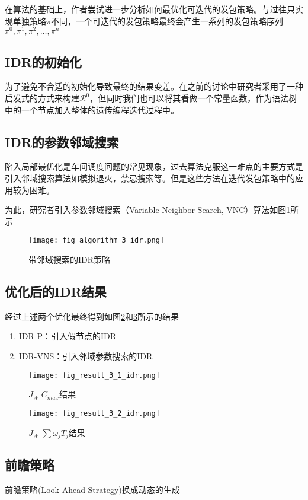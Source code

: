 在算法的基础上，作者尝试进一步分析如何最优化可迭代的发包策略。与过往只实现单独策略$\pi$不同，一个可迭代的发包策略最终会产生一系列的发包策略序列 $\pi^0,\pi^1,\pi^2,\dots,\pi^n$

\subsection{IDR的初始化}

为了避免不合适的初始化导致最终的结果变差。在之前的讨论中研究者采用了一种启发式的方式来构建$\mathcal{R}^0$，但同时我们也可以将其看做一个常量函数，作为语法树中的一个节点加入整体的遗传编程迭代过程中。

\subsection{IDR的参数邻域搜索}

陷入局部最优化是车间调度问题的常见现象，过去算法克服这一难点的主要方式是引入邻域搜索算法如模拟退火，禁忌搜索等。但是这些方法在迭代发包策略中的应用较为困难。

为此，研究者引入参数邻域搜索（Variable Neighbor Search, VNC）算法如图\ref{fig:vns_idr}所示

\begin{figure}[H]
    \centering
    \texttt{[image: fig\_algorithm\_3\_idr.png]}
    \caption{带邻域搜索的IDR策略}
    \label{fig:vns_idr}
\end{figure}

\subsection{优化后的IDR结果}

经过上述两个优化最终得到如图\ref{fig:result_enhanced_1}和\ref{fig:result_enhanced_2}所示的结果

\begin{enumerate}
    \item IDR-P：引入假节点的IDR
    \item IDR-VNS：引入邻域参数搜索的IDR
\end{enumerate}

\begin{figure}[H]
    \centering
    \texttt{[image: fig\_result\_3\_1\_idr.png]}
    \caption{$J_W|C_{max}$结果}
    \label{fig:result_enhanced_1}
\end{figure}

\begin{figure}[H]
    \centering
    \texttt{[image: fig\_result\_3\_2\_idr.png]}
    \caption{$J_W|\sum \omega_jT_j$结果}
    \label{fig:result_enhanced_2}
\end{figure}

\subsection{前瞻策略}

前瞻策略(Look Ahead Strategy)换成动态的生成